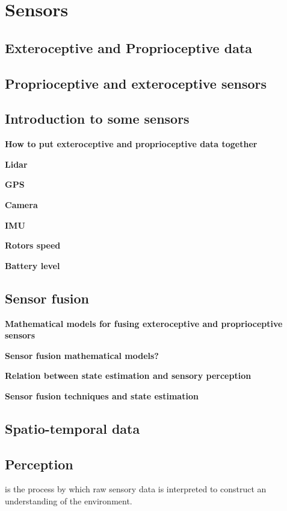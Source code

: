 \chapter{Sensors}

    



\section{Exteroceptive and Proprioceptive data}

\section{Proprioceptive and exteroceptive sensors}
\section{Introduction to some sensors}
    \textbf{How to put exteroceptive and proprioceptive data together}

    \textbf{Lidar} 

    \textbf{GPS}

    \textbf{Camera} 

    \textbf{IMU}

    \textbf{Rotors speed}

    \textbf{Battery level}

\section{Sensor fusion}
    \textbf {Mathematical models for fusing exteroceptive and proprioceptive sensors}

    \textbf{Sensor fusion mathematical models?}

    \textbf{Relation between state estimation and sensory perception}

    \textbf{Sensor fusion techniques and state estimation}

\section{Spatio-temporal data}

\section{Perception}  is the process by which raw sensory data is interpreted to construct an understanding of the environment. 

